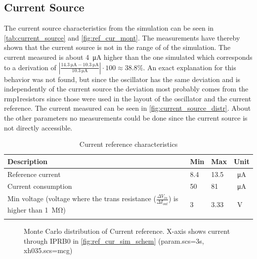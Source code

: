 \subsection{Current Source}
The current source characteristics from the simulation can be seen in \autoref{tab:current_source} and \autoref{fig:ref_cur_mont}. The measurements have thereby shown that the current source is not in the range of of the simulation. The current measured is about \qty{4}{\micro\ampere} higher than the one simulated which corresponds to a derivation of $\left|\frac{\qty{14.3}{\micro\ampere}-\qty{10.3}{\micro\ampere}}{\qty{10.3}{\micro\ampere}}\right|\cdot 100\approx 38.8 \%$. An exact explanation for this behavior was not found, but since the oscillator has the same deviation and is independently of the current source the deviation most probably comes from the \glqq rmp1\grqq resistors since those were used in the layout of the oscillator and the current reference.
The current measured can be seen in \autoref{fig:current_source_distr}. About the other parameters no measurements could be done since the current source is not directly accessible.
\begin{longtable}{|p{3.5cm}|p{3.5cm}|p{3.5cm}|p{3.5cm}|}
	\hline
	\rowcolor{lightgray}
	\textbf{Description} &\textbf{Min} &\textbf{Max} & \textbf{Unit} \\ \hline
	
	Reference current & 8.4 & 13.5 &\qty{}{\micro\ampere} \\ \hline
	Current consumption & 50 & 81 & \qty{}{\micro\ampere} \\ \hline
	Min voltage (voltage where the trans resistance ($\frac{\Delta V_{in}}{\Delta I_{out}}$) is higher than \qty{1}{\mega\ohm}) & 3& 3.33 & \qty{}{\volt} \\ \hline
	\caption{Current reference characteristics} %
	\label{tab:current_source}
\end{longtable}
\begin{figure}[ht]
	\centering
	\caption{Monte Carlo distribution of Current reference. X-axis shows current through \glqq IPRB0\grqq{} in \autoref{fig:ref_cur_sim_schem} (param.scs=3s, xh035.scs=mcg)}
	\label{fig:ref_cur_mont}
\end{figure}
